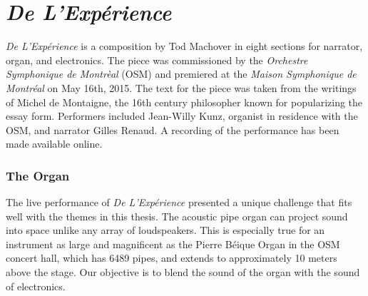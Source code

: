\clearpage
\chapter{\textit{De L'Exp\'{e}rience}}
\label{ch:experience}

\textit{De L'Exp\'{e}rience} is a composition by Tod Machover in eight
sections for narrator, organ, and electronics. The piece was
commissioned by the \textit{Orchestre Symphonique de Montr\`{e}al}
(OSM) and premiered at the \textit{Maison Symphonique de Montr\'{e}al}
on May 16th, 2015. The text for the piece was taken from the writings
of Michel de Montaigne, the 16th century philosopher known for
popularizing the essay form.  Performers included Jean-Willy Kunz,
organist in residence with the OSM, and narrator Gilles Renaud. A
recording of the performance has been made available
online.


\subsection{The Organ}
\label{sec:organ}
The live performance of \textit{De L'Exp\'{e}rience} presented a
unique challenge that fits well with the themes in this thesis. The
acoustic pipe organ can project sound into space unlike any array of
loudspeakers. This is especially true for an instrument as large and
magnificent as the Pierre B\'{e}ique Organ in the OSM concert hall,
which has 6489 pipes, and extends to approximately 10 meters above the
stage. Our objective is to blend the sound of the organ with the sound
of electronics.

